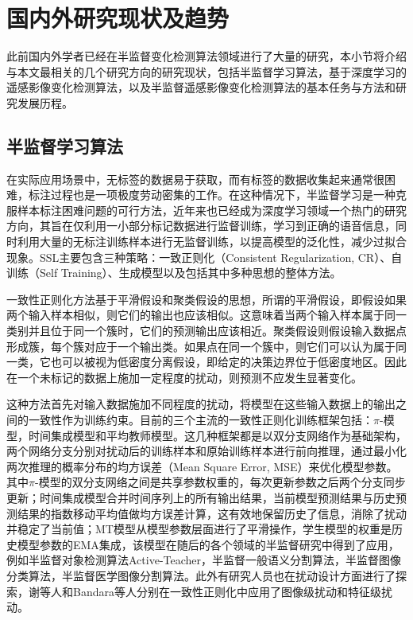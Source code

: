 \documentclass[lang=chs, degree=master, blindreview=false, adobe=false]{yanputhesis}
\begin{document}
\section{国内外研究现状及趋势}
此前国内外学者已经在半监督变化检测算法领域进行了大量的研究，本小节将介绍与本文最相关的几个研究方向的研究现状，包括半监督学习算法，基于深度学习的遥感影像变化检测算法，以及半监督遥感影像变化检测算法的基本任务与方法和研究发展历程。
\subsection{半监督学习算法}
在实际应用场景中，无标签的数据易于获取，而有标签的数据收集起来通常很困难，标注过程也是一项极度劳动密集的工作。在这种情况下，半监督学习是一种克服样本标注困难问题的可行方法，近年来也已经成为深度学习领域一个热门的研究方向，其旨在仅利用一小部分标记数据进行监督训练，学习到正确的语音信息，同时利用大量的无标注训练样本进行无监督训练，以提高模型的泛化性，减少过拟合现象。SSL主要包含三种策略：一致正则化（Consistent Regularization, CR）、自训练（Self Training）、生成模型以及包括其中多种思想的整体方法。

一致性正则化方法基于平滑假设\cite{van2020smmooth}和聚类假设\cite{lee2013pseudo}的思想，所谓的平滑假设，即假设如果两个输入样本相似，则它们的输出也应该相似。这意味着当两个输入样本属于同一类别并且位于同一个簇时，它们的预测输出应该相近。聚类假设则假设输入数据点形成簇，每个簇对应于一个输出类。如果点在同一个簇中，则它们可以认为属于同一类，它也可以被视为低密度分离假设，即给定的决策边界位于低密度地区。因此在一个未标记的数据上施加一定程度的扰动，则预测不应发生显著变化。

这种方法首先对输入数据施加不同程度的扰动，将模型在这些输入数据上的输出之间的一致性作为训练约束。目前的三个主流的一致性正则化训练框架包括：$\pi$-模型\cite{laine2016temporal}，时间集成模型\cite{laine2016temporal}和平均教师模型\cite{Tarvainen2017teacher}。这几种框架都是以双分支网络作为基础架构，两个网络分支分别对扰动后的训练样本和原始训练样本进行前向推理，通过最小化两次推理的概率分布的均方误差（Mean Square Error, MSE）来优化模型参数。其中$\pi$-模型的双分支网络之间是共享参数权重的，每次更新参数之后两个分支同步更新；时间集成模型合并时间序列上的所有输出结果，当前模型预测结果与历史预测结果的指数移动平均值做均方误差计算，这有效地保留历史了信息，消除了扰动并稳定了当前值；MT模型从模型参数层面进行了平滑操作，学生模型的权重是历史模型参数的EMA集成，该模型在随后的各个领域的半监督研究中得到了应用，例如半监督对象检测算法Active-Teacher\cite{ActiveTeacher}，半监督一般语义分割算法\cite{mittal2019s4GAN}\cite{UniMatch}\cite{AugSeg}\cite{iMAS}，半监督图像分类算法\cite{sohn2020fixmatch}，半监督医学图像分割算法\cite{transformation_medical}\cite{zhangSemiSAMExploringSAM2023}。此外有研究人员也在扰动设计方面进行了探索，谢等人\cite{xie2020unsupervised}和Bandara等人\cite{bandara2022RCR}分别在一致性正则化中应用了图像级扰动和特征级扰动。
\end{document}

